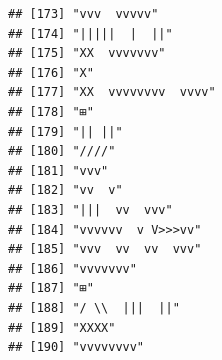 \documentclass[
]{article}
\begin{document}
\begin{verbatim}
## [173] "vvv  vvvvv"                                                                                                                               
## [174] "|||||  |  ||"                                                                                                                             
## [175] "XX  vvvvvvv"                                                                                                                              
## [176] "X"                                                                                                                                        
## [177] "XX  vvvvvvvv  vvvv"                                                                                                                       
## [178] "⊞"                                                                                                                                        
## [179] "|| ||"                                                                                                                                    
## [180] "////"                                                                                                                                     
## [181] "vvv"                                                                                                                                      
## [182] "vv  v"                                                                                                                                    
## [183] "|||  vv  vvv"                                                                                                                             
## [184] "vvvvvv  v V>>>vv"                                                                                                                         
## [185] "vvv  vv  vv  vvv"                                                                                                                         
## [186] "vvvvvvv"                                                                                                                                  
## [187] "⊞"                                                                                                                                        
## [188] "/ \\  |||  ||"                                                                                                                            
## [189] "XXXX"                                                                                                                                     
## [190] "vvvvvvvv"                                                                                                                                 

\end{verbatim}
\end{document}
